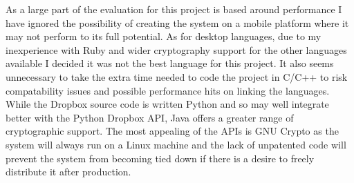 \documentclass[10pt, titlepage]{article}
\begin{document}
\newline As a large part of the evaluation for this project is based around performance I have ignored the possibility of creating the system on a mobile platform where it may not perform to its full potential. As for desktop languages, due to my inexperience with Ruby and wider cryptography support for the other languages available I decided it was not the best language for this project. It also seems unnecessary to take the extra time needed to code the project in C/C++ to risk compatability issues and possible performance hits on linking the languages. While the Dropbox source code is written Python and so may well integrate better with the Python Dropbox API, Java offers a greater range of cryptographic support. The most appealing of the APIs is GNU Crypto as the system will always run on a Linux machine and the lack of unpatented code will prevent the system from becoming tied down if there is a desire to freely distribute it after production.
\end{document}
